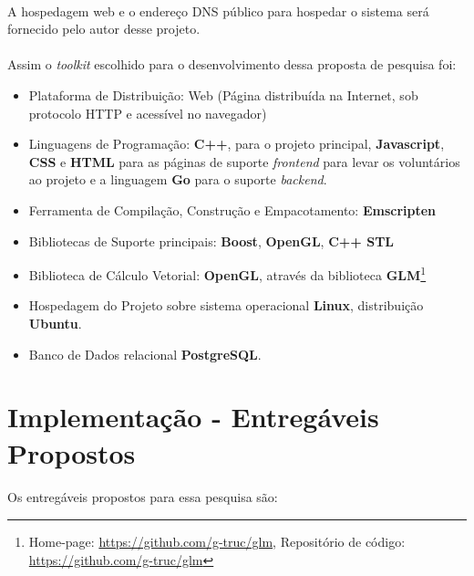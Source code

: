 \documentclass{article}
\begin{document}
	\paragraph{}
	A hospedagem web e o endereço DNS público para hospedar o sistema será fornecido pelo autor desse projeto.
	
	\paragraph{}
	Assim o \textit{toolkit} escolhido para o desenvolvimento dessa proposta de pesquisa foi:
	
	\begin{itemize}
			\item Plataforma de Distribuição: Web (Página distribuída na Internet, sob protocolo HTTP e acessível no navegador)
			\item Linguagens de Programação: \textbf{C++}, para o projeto principal, \textbf{Javascript}, \textbf{CSS} e 	\textbf{HTML} para as páginas de suporte \textit{frontend} para levar os voluntários ao projeto e a linguagem \textbf{Go} para o suporte \textit{backend}.
			\item Ferramenta de Compilação, Construção e Empacotamento: \textbf{Emscripten}
			\item Bibliotecas de Suporte principais: \textbf{Boost}, \textbf{OpenGL}, \textbf{C++ STL}
			\item Biblioteca de Cálculo Vetorial: \textbf{OpenGL}, através da biblioteca \textbf{GLM}\footnote{Home-page: \url{https://github.com/g-truc/glm}, Repositório de código: \url{https://github.com/g-truc/glm}}	
			\item Hospedagem do Projeto sobre sistema operacional \textbf{Linux}, distribuição \textbf{Ubuntu}.	
			\item Banco de Dados relacional \textbf{PostgreSQL}.
	\end{itemize}
	
	\section{Implementação - Entregáveis Propostos} \label{ie}
	\paragraph{}
	Os entregáveis propostos para essa pesquisa são:
	
\end{document}

